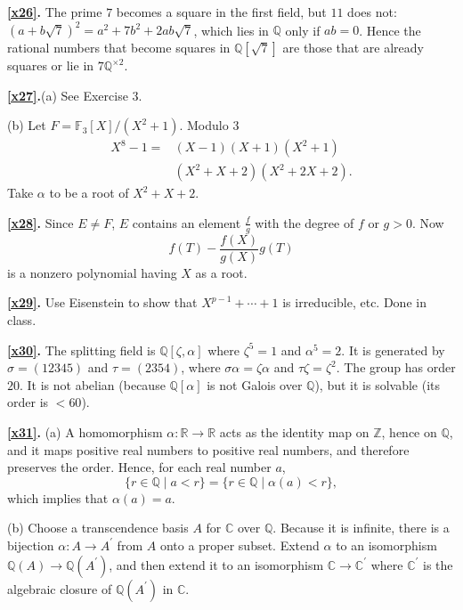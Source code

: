 \documentclass[a4paper,11pt,final,openany]{memoir}
\theoremstyle{nonumberplain}
\begin{document}
\medskip\noindent\textbf{\ref{x26}.} The prime $7$ becomes a square in the
first field, but $11$ does not: $(a+b\sqrt{7})^{2}=a^{2}+7b^{2}+2ab\sqrt{7}$,
which lies in ${\mathbb{Q}}$ only if $ab=0$. Hence the rational numbers that
become squares in ${\mathbb{Q}}[\sqrt{7}]$ are those that are already squares
or lie in $7{\mathbb{Q}}^{\times2}$.

\medskip\noindent\textbf{\ref{x27}.}(a) See Exercise 3.

(b) Let $F=\mathbb{F}_{3}[X]/(X^{2}+1)$. Modulo $3$
\begin{align*}
  X^{8}-1=&(X-1)(X+1)(X^{2}+1)\\
  &(X^{2}+X+2)(X^{2}+2X+2).
\end{align*}
Take $\alpha$ to be a root of $X^{2}+X+2$.

\medskip\noindent\textbf{\ref{x28}.} Since $E\neq F$, $E$ contains an element
$\frac{f}{g}$ with the degree of $f$ or $g>0$. Now
\[
f(T)-\frac{f(X)}{g(X)}g(T)
\]
is a nonzero polynomial having $X$ as a root.

\medskip\noindent\textbf{\ref{x29}.} Use Eisenstein to show that
$X^{p-1}+\cdots+1$ is irreducible, etc. Done in class.

\medskip\noindent\textbf{\ref{x30}.} The splitting field is ${\mathbb{Q}%
}[\zeta,\alpha]$ where $\zeta^{5}=1$ and $\alpha^{5}=2$. It is generated by
$\sigma=(12345)$ and $\tau=(2354)$, where $\sigma\alpha=\zeta\alpha$ and
$\tau\zeta=\zeta^{2}$. The group has order $20$. It is not abelian (because
${\mathbb{Q}}[\alpha]$ is not Galois over ${\mathbb{Q}}$), but it is solvable
(its order is $<60$).

\medskip\noindent\textbf{\ref{x31}.} (a) A homomorphism $\alpha\colon
\mathbb{R}{}\rightarrow\mathbb{R}{}$ acts as the identity map on $\mathbb{Z}%
{}$, hence on $\mathbb{Q}{}$, and it maps positive real numbers to positive
real numbers, and therefore preserves the order. Hence, for each real number
$a$,
\[
\{r\in{\mathbb{Q}}\mid a<r\}=\{r\in{\mathbb{Q}}\mid\alpha(a)<r\},
\]
which implies that $\alpha(a)=a$.

(b) Choose a transcendence basis $A$ for $\mathbb{C}$ over ${\mathbb{Q}}$.
Because it is infinite, there is a bijection $\alpha\colon A\rightarrow
A^{\prime}$ from $A$ onto a proper subset. Extend $\alpha$ to an isomorphism
${\mathbb{Q}}(A)\rightarrow{\mathbb{Q}}(A^{\prime})$, and then extend it to an
isomorphism $\mathbb{C}\rightarrow\mathbb{C}^{\prime}$ where $\mathbb{C}%
^{\prime}$ is the algebraic closure of ${\mathbb{Q}}(A^{\prime})$ in
$\mathbb{C}$.
\end{document}
